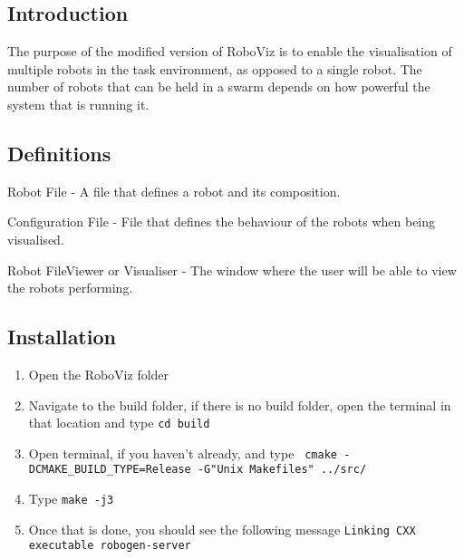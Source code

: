 

\subsection{Introduction}
\label{s:introduction}

The purpose of the modified version of RoboViz is to enable the visualisation of multiple robots in the task environment, as opposed to
a single robot. The number of robots that can be held in a swarm depends on how powerful the system that is running it.

\subsection{Definitions}
\label{s:definitions}

Robot File - A file that defines a robot and its composition.

Configuration File - File that defines the behaviour of the robots when being visualised.

Robot FileViewer or Visualiser - The window where the user will be able to view the robots performing.

\subsection{Installation}
\label{s:installation}

\begin{enumerate}
    \item Open the RoboViz folder
    \item Navigate to the build folder, if there is no build folder, open the terminal in that location and type \texttt{cd build}
    \item Open terminal, if you haven't already, and type \texttt{ cmake -DCMAKE\_BUILD\_TYPE=Release -G"Unix Makefiles" ../src/ }
    \item Type \texttt{make -j3}
    \item Once that is done, you should see the following message \texttt{Linking CXX executable robogen-server}
\end{enumerate}

